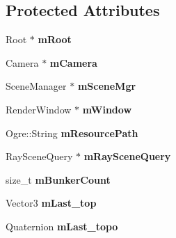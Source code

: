 \subsection*{Protected Attributes}
\begin{DoxyCompactItemize}
\item 
\hypertarget{class_p_f_b_application_ab7fcd895734d2d499aaac33273e5d7be}{
Root $\ast$ {\bfseries mRoot}}
\label{class_p_f_b_application_ab7fcd895734d2d499aaac33273e5d7be}

\item 
\hypertarget{class_p_f_b_application_aef70cb85b38871f019ce05140a6adc08}{
Camera $\ast$ {\bfseries mCamera}}
\label{class_p_f_b_application_aef70cb85b38871f019ce05140a6adc08}

\item 
\hypertarget{class_p_f_b_application_af83238e3e636361f1768ed00ffdfb820}{
SceneManager $\ast$ {\bfseries mSceneMgr}}
\label{class_p_f_b_application_af83238e3e636361f1768ed00ffdfb820}

\item 
\hypertarget{class_p_f_b_application_afead5eff97b81676fa0c670d49111f31}{
RenderWindow $\ast$ {\bfseries mWindow}}
\label{class_p_f_b_application_afead5eff97b81676fa0c670d49111f31}

\item 
\hypertarget{class_p_f_b_application_aefb8ccd97955a40ea41aedd062ec2e50}{
Ogre::String {\bfseries mResourcePath}}
\label{class_p_f_b_application_aefb8ccd97955a40ea41aedd062ec2e50}

\item 
\hypertarget{class_p_f_b_application_a029742580add749a97b69c81b5ab0613}{
RaySceneQuery $\ast$ {\bfseries mRaySceneQuery}}
\label{class_p_f_b_application_a029742580add749a97b69c81b5ab0613}

\item 
\hypertarget{class_p_f_b_application_a0fedc6ff97e1fed6019397124e8382f5}{
size\_\-t {\bfseries mBunkerCount}}
\label{class_p_f_b_application_a0fedc6ff97e1fed6019397124e8382f5}

\item 
\hypertarget{class_p_f_b_application_a610e6a33c285cafd636a258a69445cf6}{
Vector3 {\bfseries mLast\_\-top}}
\label{class_p_f_b_application_a610e6a33c285cafd636a258a69445cf6}

\item 
\hypertarget{class_p_f_b_application_aa21944180e3e88d5b34db26b0e196e52}{
Quaternion {\bfseries mLast\_\-topo}}
\label{class_p_f_b_application_aa21944180e3e88d5b34db26b0e196e52}


\end{DoxyCompactItemize}
